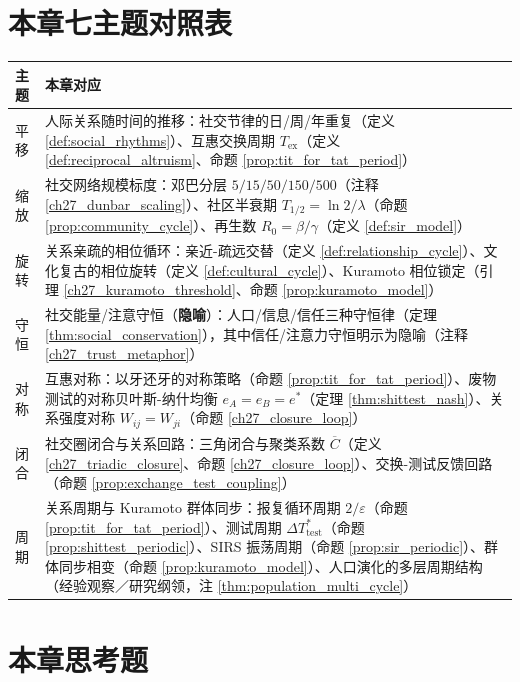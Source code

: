 \section*{本章七主题对照表}
\begin{center}
\begin{tabular}{>{\centering\arraybackslash}p{2.2cm}>{\centering\arraybackslash}p{9.5cm}}
\toprule
主题 & 本章对应 \\
\midrule
平移 & 人际关系随时间的推移：社交节律的日/周/年重复（定义 \ref{def:social_rhythms}）、互惠交换周期 $T_{\text{ex}}$（定义 \ref{def:reciprocal_altruism}、命题 \ref{prop:tit_for_tat_period}） \\
缩放 & 社交网络规模标度：邓巴分层 $5/15/50/150/500$（注释 \ref{ch27_dunbar_scaling}）、社区半衰期 $T_{1/2}=\ln2/\lambda$（命题 \ref{prop:community_cycle}）、再生数 $R_0=\beta/\gamma$（定义 \ref{def:sir_model}） \\
旋转 & 关系亲疏的相位循环：亲近-疏远交替（定义 \ref{def:relationship_cycle}）、文化复古的相位旋转（定义 \ref{def:cultural_cycle}）、Kuramoto 相位锁定（引理 \ref{ch27_kuramoto_threshold}、命题 \ref{prop:kuramoto_model}） \\
守恒 & 社交能量/注意守恒（\textbf{隐喻}）：人口/信息/信任三种守恒律（定理 \ref{thm:social_conservation}），其中信任/注意力守恒明示为隐喻（注释 \ref{ch27_trust_metaphor}） \\
对称 & 互惠对称：以牙还牙的对称策略（命题 \ref{prop:tit_for_tat_period}）、废物测试的对称贝叶斯-纳什均衡 $e_A=e_B=e^*$（定理 \ref{thm:shittest_nash}）、关系强度对称 $W_{ij}=W_{ji}$（命题 \ref{ch27_closure_loop}） \\
闭合 & 社交圈闭合与关系回路：三角闭合与聚类系数 $\overline{C}$（定义 \ref{ch27_triadic_closure}、命题 \ref{ch27_closure_loop}）、交换-测试反馈回路（命题 \ref{prop:exchange_test_coupling}） \\
周期 & 关系周期与 Kuramoto 群体同步：报复循环周期 $2/\varepsilon$（命题 \ref{prop:tit_for_tat_period}）、测试周期 $\Delta T_{\text{test}}^*$（命题 \ref{prop:shittest_periodic}）、SIRS 振荡周期（命题 \ref{prop:sir_periodic}）、群体同步相变（命题 \ref{prop:kuramoto_model}）、人口演化的多层周期结构（经验观察／研究纲领，注 \ref{thm:population_multi_cycle}） \\
\bottomrule
\end{tabular}
\end{center}

\section*{本章思考题}

